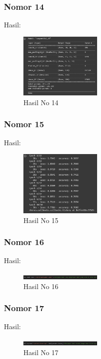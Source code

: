 \subsubsection{Nomor 14}
\hfill\break

Hasil:
\begin{figure}[H]
\centering
	\includegraphics[width=4cm]{figures/1174057/chapter7/no14.jpg}
	\caption{Hasil No 14}
\end{figure}

\subsubsection{Nomor 15}
\hfill\break

Hasil:
\begin{figure}[H]
\centering
	\includegraphics[width=4cm]{figures/1174057/chapter7/no15.jpg}
	\caption{Hasil No 15}
\end{figure}

\subsubsection{Nomor 16}
\hfill\break

Hasil:
\begin{figure}[H]
\centering
	\includegraphics[width=4cm]{figures/1174057/chapter7/no16.jpg}
	\caption{Hasil No 16}
\end{figure}

\subsubsection{Nomor 17}
\hfill\break

Hasil:
\begin{figure}[H]
\centering
	\includegraphics[width=4cm]{figures/1174057/chapter7/no17.jpg}
	\caption{Hasil No 17}
\end{figure}

